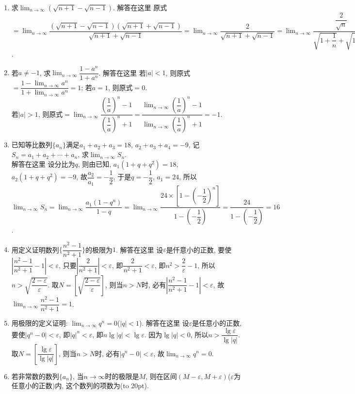 \documentclass[10pt,a4paper]{article}
\newcommand{\bracket}[1]{(\hbox to #1pt{})}
\begin{document}
\begin{enumerate}[1.]
\item 求$\displaystyle \lim_{n\to \infty} (\sqrt {n+1}-\sqrt {n-1})$.
解答在这里  原式$=\displaystyle \lim_{n\to \infty} \dfrac{(\sqrt {n+1}-\sqrt {n-1})(\sqrt {n+1}+\sqrt {n-1})}{\sqrt {n+1}+\sqrt {n-1}}=\displaystyle \lim_{n\to \infty} \dfrac 2{\sqrt {n+1}+\sqrt {n-1}}=\displaystyle \lim_{n\to \infty} \dfrac{\dfrac 2{\sqrt n}}{\sqrt {1+\dfrac 1n}+\sqrt {1-\dfrac 1n}}=\dfrac 0{1+1}=0$.
\item 若$a\ne -1$, 求$\displaystyle \lim_{n\to \infty} \dfrac{1-{a^n}}{1+{a^n}}$.
解答在这里 若$|a|<1$, 则原式$=\dfrac{1-\displaystyle\lim_{n\to \infty}{a^n}}{1+\displaystyle\lim_{n\to \infty}{a^n}}=1$; 若$a=1$, 则原式$=0$.  \\
若$|a|>1$, 则原式$=\displaystyle \lim_{n\to \infty} \dfrac{{{(\dfrac 1a)}^n}-1}{{{(\dfrac 1a)}^n}+1}=\dfrac{\displaystyle\lim_{n\to \infty}{{(\dfrac 1a)}^n}-1}{\displaystyle\lim_{n\to \infty}{{(\dfrac 1a)}^n}+1}=-1$.
\item 已知等比数列$\{a_n\}$满足$a_1+a_2+a_3=18$, $a_2+a_3+a_4=-9$, 记$S_n=a_1+a_2+\cdots +a_n$, 求$\displaystyle \lim_{n\to \infty} S_n$.\\
解答在这里  设分比为$q$, 则由已知, $a_1(1+q+q^2)=18$, $a_2(1+q+q^2)=-9$,
故$\dfrac{a_2}{a_1}=-\dfrac 12$, 于是$q=-\dfrac 12$, $a_1=24$, 所以$\displaystyle \lim_{n\to \infty} S_n=\displaystyle \lim_{n\to \infty} \dfrac{{a_1}(1-{q^n})}{1-q}=\displaystyle \lim_{n\to \infty} \dfrac{24\times [1-{{(-\dfrac 12)}^n}]}{1-(-\dfrac 12)}=\dfrac{24}{1-(-\dfrac 12)}=16$.
\item 用定义证明数列$\{\dfrac{{n^2}-1}{{n^2}+1}\}$的极限为$1$.
解答在这里  设$\varepsilon$是仟意小的正数, 要使$|\dfrac{{n^2}-1}{{n^2}+1}-1|<\varepsilon$, 只要$|\dfrac 2{n^2+1}|<\varepsilon$,
即$\dfrac 2{n^2+1}<\varepsilon$, 即$n^2>\dfrac 2{\varepsilon }-1$, 所以$n>\sqrt {\dfrac{2-\varepsilon }{\varepsilon }}$.
取$N=[\sqrt {\dfrac{2-\varepsilon }{\varepsilon }}]$, 则当$n>N$时, 必有$|\dfrac{{n^2}-1}{{n^2}+1}-1|<\varepsilon$, 故$\displaystyle \lim_{n\to \infty} \dfrac{{n^2}-1}{{n^2}+1}=1$.
\item 用极限的定义证明: $\displaystyle \lim_{n\to \infty} q^n=0$($|q|<1$).
解答在这里  设$\varepsilon$是任意小的正数, 要使$|q^n-0|<\varepsilon$, 即$|q|^n<\varepsilon$, 即$n\lg|q|<\lg \varepsilon$.
因为$\lg|q|<0$, 所以$n>\dfrac{\lg \varepsilon }{\lg|q|}$.
取$N=[\dfrac{\lg \varepsilon }{\lg|q|}]$, 则当$n>N$时, 必有$|q^n-0|<\varepsilon$, 故$\displaystyle \lim_{n\to \infty} q^n=0$.
\item 若非常数的数列$\{a_n\}$, 当$n\to \infty$时的极限是$M$, 则在区间$(M-\varepsilon ,M+\varepsilon)$($\varepsilon$为任意小的正数)内, 这个数列的项数为\bracket{20}.

\end{enumerate}
\end{document}
